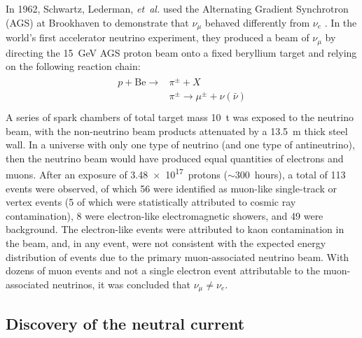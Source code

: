 In 1962, Schwartz, Lederman, \emph{et~al.} used the
Alternating Gradient Synchrotron (AGS) at Brookhaven
to demonstrate that $\nu_\mu$ behaved differently from $\nu_e$
\cite{numu_vs_nue}.
In the world's first accelerator neutrino experiment,
they produced a beam of $\nu_\mu$ by directing
the \SI{15}{\GeV} AGS proton beam
onto a fixed beryllium target and relying on the following reaction chain:
\begin{align}\label{eq:accel_reaction_chain}
    \begin{split}
        p + \text{Be} \to &\pi^{\pm} + X \\
        &\pi^{\pm} \to \mu^{\pm} + \nu(\bar{\nu}) \\
    \end{split}
\end{align}
A series of spark chambers of total target mass \SI{10}{\tonne}
was exposed to the neutrino beam,
with the non-neutrino beam products attenuated
by a \SI{13.5}{\m} thick steel wall.
In a universe with only one type of neutrino (and one type of antineutrino),
then the neutrino beam would have produced equal quantities
of electrons and muons.
After an exposure of \num{3.48e17}~protons ($\sim300$~hours),
a total of 113 events were observed,
of which 56 were identified as muon-like single-track or vertex events
(5 of which were statistically attributed to cosmic ray contamination),
8 were electron-like electromagnetic showers, and 49 were background.
The electron-like events were attributed to
kaon contamination in the beam,
and, in any event, were not consistent with the
expected energy distribution of events due to the
primary muon-associated neutrino beam.
With dozens of muon events and not a single electron event
attributable to the muon-associated neutrinos,
it was concluded that $\nu_\mu \neq \nu_e$.


\subsection{Discovery of the neutral current}
\label{subsec:neutral_current}


